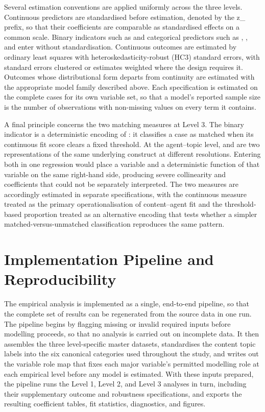 Several estimation conventions are applied uniformly across the three levels. Continuous predictors are standardised before estimation, denoted by the z\_ prefix, so that their coefficients are comparable as standardised effects on a common scale. Binary indicators such as  and categorical predictors such as , , and  enter without standardisation. Continuous outcomes are estimated by ordinary least squares with heteroskedasticity-robust (HC3) standard errors, with standard errors clustered or estimates weighted where the design requires it. Outcomes whose distributional form departs from continuity are estimated with the appropriate model family described above. Each specification is estimated on the complete cases for its own variable set, so that a model's reported sample size is the number of observations with non-missing values on every term it contains.

A final principle concerns the two matching measures at Level 3. The binary indicator  is a deterministic encoding of : it classifies a case as matched when its continuous fit score clears a fixed threshold. At the agent–topic level,  and  are two representations of the same underlying construct at different resolutions. Entering both in one regression would place a variable and a deterministic function of that variable on the same right-hand side, producing severe collinearity and coefficients that could not be separately interpreted. The two measures are accordingly estimated in separate specifications, with the continuous measure treated as the primary operationalisation of content–agent fit and the threshold-based proportion treated as an alternative encoding that tests whether a simpler matched-versus-unmatched classification reproduces the same pattern.

\section{Implementation Pipeline and Reproducibility}
\label{sec:5-6-implementation-pipeline-and-reproducibility}

The empirical analysis is implemented as a single, end-to-end pipeline, so that the complete set of results can be regenerated from the source data in one run. The pipeline begins by flagging missing or invalid required inputs before modelling proceeds, so that no analysis is carried out on incomplete data. It then assembles the three level-specific master datasets, standardises the content topic labels into the six canonical categories used throughout the study, and writes out the variable role map that fixes each major variable's permitted modelling role at each empirical level before any model is estimated. With these inputs prepared, the pipeline runs the Level 1, Level 2, and Level 3 analyses in turn, including their supplementary outcome and robustness specifications, and exports the resulting coefficient tables, fit statistics, diagnostics, and figures.

